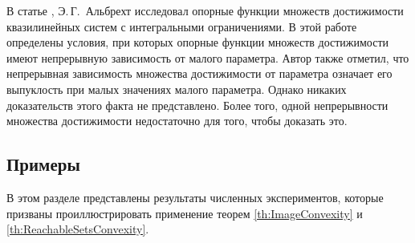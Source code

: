 \documentclass[../main.tex]{subfiles}
\begin{document}
\begin{zam}  
	В статье \cite{Albrecht2}, Э.\,Г.~Альбрехт исследовал опорные функции множеств достижимости квазилинейных систем с интегральными ограничениями. В этой работе определены условия, при которых опорные функции множеств достижимости имеют непрерывную зависимость от малого параметра.  Автор также отметил, что непрерывная зависимость множества достижимости от параметра означает его выпуклость при малых значениях малого параметра. Однако никаких доказательств этого факта не представлено. Более того, одной непрерывности множества достижимости недостаточно для того, чтобы доказать это.
\end{zam}

\subsection{Примеры}

В этом разделе представлены результаты численных экспериментов, которые призваны проиллюстрировать применение теорем \ref{th:ImageConvexity} и \ref{th:ReachableSetsConvexity}. 
\end{document}

